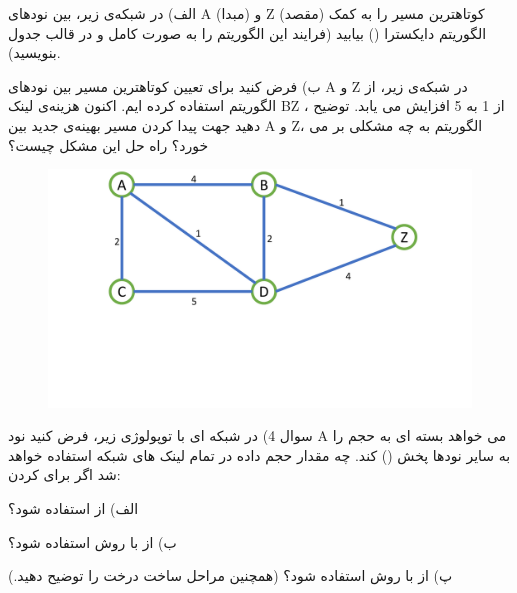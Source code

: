 \documentclass[10pt,letterpaper]{article}
\begin{document}
الف) در شبکه‌ی زیر، بین نودهای A (مبدا) و Z (مقصد) کوتاهترین مسیر را به کمک الگوریتم دایکسترا () بیابید (فرایند این الگوریتم را به صورت کامل و در قالب جدول بنویسید).

ب) فرض کنید برای تعیین کوتاهترین مسیر بین نودهای A و Z در شبکه‌ی زیر، از الگوریتم 
استفاده کرده ایم. اکنون هزینه‌ی لینک BZ ، از 1 به 5 افزایش می یابد. توضیح دهید جهت پیدا کردن مسیر بهینه‌ی جدید بین A و Z، الگوریتم 
به چه مشکلی بر می خورد؟ راه حل این مشکل چیست؟
\begin{figure}[htb]
\centering
\includegraphics[width=160mm]{dij.pdf}
\end{figure}
\newpage
سوال 4) در شبکه ای با توپولوژی زیر، فرض کنید نود A می خواهد بسته ای به حجم 
را به سایر نودها پخش 
()
کند. چه مقدار حجم داده در تمام لینک های شبکه استفاده خواهد شد اگر برای 
کردن:

الف) از
استفاده شود؟

ب) از
با روش 
استفاده شود؟

پ) از 
 با روش 
استفاده شود؟ (همچنین مراحل ساخت درخت را توضیح دهید.)
\end{document}
